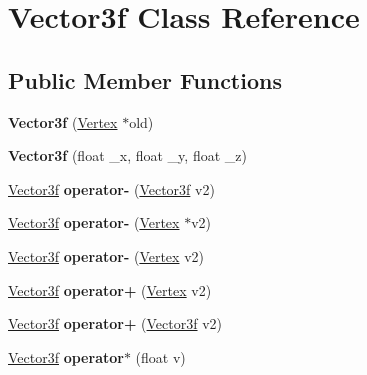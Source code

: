 \hypertarget{class_vector3f}{}\section{Vector3f Class Reference}
\label{class_vector3f}
\subsection*{Public Member Functions}
\begin{DoxyCompactItemize}
\item 
\mbox{\label{class_vector3f_a44a7820fe5223bebb6ef902c3942a96a}} 
{\bfseries Vector3f} (\hyperlink{class_vertex}{Vertex} $\ast$old)
\item 
\mbox{\label{class_vector3f_ac2caf1fd41076826fe50b3a527ef90db}} 
{\bfseries Vector3f} (float \+\_\+x, float \+\_\+y, float \+\_\+z)
\item 
\mbox{\label{class_vector3f_ad2b60dc77ac826601b53dfbe00a10e8b}} 
\hyperlink{class_vector3f}{Vector3f} {\bfseries operator-\/} (\hyperlink{class_vector3f}{Vector3f} v2)
\item 
\mbox{\label{class_vector3f_a825c94e2a03cf1848f326090d870a48b}} 
\hyperlink{class_vector3f}{Vector3f} {\bfseries operator-\/} (\hyperlink{class_vertex}{Vertex} $\ast$v2)
\item 
\mbox{\label{class_vector3f_a8c508043e7a51811690aa0f7621d27ad}} 
\hyperlink{class_vector3f}{Vector3f} {\bfseries operator-\/} (\hyperlink{class_vertex}{Vertex} v2)
\item 
\mbox{\label{class_vector3f_aac989fe2139af72f485aff7bd834f7ba}} 
\hyperlink{class_vector3f}{Vector3f} {\bfseries operator+} (\hyperlink{class_vertex}{Vertex} v2)
\item 
\mbox{\label{class_vector3f_aefe47612044b40b40ae99bd1bdb6a6b7}} 
\hyperlink{class_vector3f}{Vector3f} {\bfseries operator+} (\hyperlink{class_vector3f}{Vector3f} v2)
\item 
\mbox{\label{class_vector3f_ad0b4d24609bb325fa4255f40c09d71d4}} 
\hyperlink{class_vector3f}{Vector3f} {\bfseries operator$\ast$} (float v)

\end{DoxyCompactItemize}
